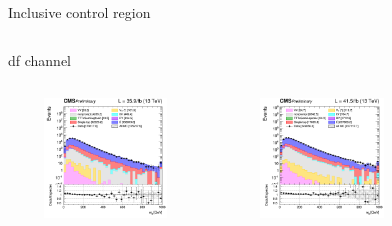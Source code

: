 \documentclass[8pt]{beamer}
\begin{document}
\begin{frame}{Inclusive control region}
\begin{columns}
\begin{column}{1.09\textwidth}
\begin{block}{\centering df channel}\end{block}
\end{column}
\end{columns} \vspace{-5pt}
\begin{columns}
		\begin{column}{0.33\textwidth}
			\begin{center}
			\vspace{-8pt}
			\begin{block}{}\end{block}\vspace{10pt}
     			\includegraphics[width=1.0\textwidth, height=90pt]{figs/2016/log_cratio_inclusiveCR_df_mll.png}
    		\end{center}		
		\end{column} 
		\begin{column}{0.33\textwidth}
			\begin{center}
			\vspace{-8pt}
			\begin{block}{}\end{block}\vspace{10pt}
     			\includegraphics[width=1.0\textwidth, height=90pt]{figs/2017/log_cratio_inclusiveCR_df_mll.png}
    		\end{center}		
		\end{column} 
		\begin{column}{0.33\textwidth}
			\begin{center}
			\vspace{-8pt}

\end{center}
\end{column}
\end{columns}
\end{frame}
\end{document}
